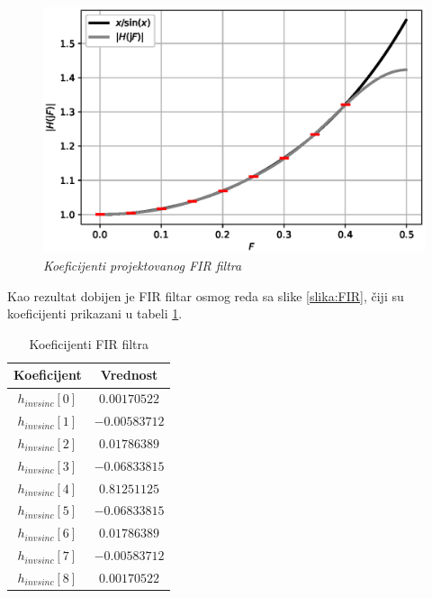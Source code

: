 \documentclass[conference]{IEEEtran}
\begin{document}
\begin{figure}[h]
	\centering
	\includegraphics[scale=0.45]{./slike/poredjenje.eps}
	\caption{\textsl{Koeficijenti projektovanog FIR filtra}}
	\label{slika:poredjenje}
\end{figure}

Kao rezultat dobijen je FIR filtar osmog reda sa slike \ref{slika:FIR}, čiji su koeficijenti prikazani u tabeli \ref{table:FIR}.

\begin{table}[h!]
	\centering
	\caption{Koeficijenti FIR filtra}
	\begin{tabular}{ c|c } 
		Koeficijent		&   Vrednost\\
		\hline
		$h_{invsinc}[0]$ &  $0.00170522$\\ 
		$h_{invsinc}[1]$ &  $-0.00583712$\\ 
		$h_{invsinc}[2]$ &  $0.01786389$\\ 
		$h_{invsinc}[3]$ &  $-0.06833815$\\ 
		$h_{invsinc}[4]$ &  $0.81251125$\\ 
		$h_{invsinc}[5]$ &  $-0.06833815$\\ 
		$h_{invsinc}[6]$ &  $0.01786389$\\
		$h_{invsinc}[7]$ &  $-0.00583712$\\  
		$h_{invsinc}[8]$ &  $0.00170522$\\ 
	\end{tabular}
	\label{table:FIR}
\end{table}
\end{document}
